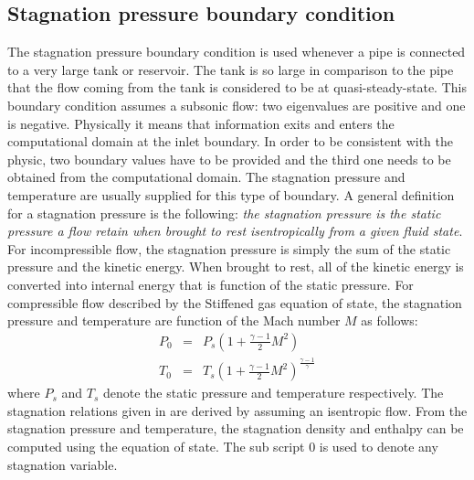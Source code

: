 \subsection{Stagnation pressure boundary condition} \label{sec:stag_pressure_bc}
The stagnation pressure boundary condition is used whenever a pipe is connected to a very large tank or reservoir. The tank is so large in comparison to the pipe that the flow coming from the tank is considered to be at quasi-steady-state. This boundary condition assumes a subsonic flow: two eigenvalues are positive and one is negative. Physically it means that information exits and enters the computational domain at the inlet boundary.  In order to be consistent with the physic, two boundary values have to be provided and the third one needs to be obtained from the computational domain. The stagnation pressure and temperature are usually supplied for this type of boundary. A general definition for a stagnation pressure is the following: \emph{the stagnation pressure is the static pressure a flow retain when brought to rest isentropically from a given fluid state}. For incompressible flow, the stagnation pressure is simply the sum of the static pressure and the kinetic energy. When brought to rest, all of the kinetic energy is converted into internal energy that is function of the static pressure. For compressible flow described by the Stiffened gas equation of state, the stagnation pressure and temperature are function of the Mach number $M$ as follows:
\begin{eqnarray}\label{eq:stag_bc}
P_0 &=& P_s \left( 1 + \frac{\gamma-1}{2}M^2 \right)\\
T_0 &=& T_s \left( 1 + \frac{\gamma-1}{2}M^2 \right)^{\frac{\gamma-1}{\gamma}}
\end{eqnarray}   
where $P_s$ and $T_s$ denote the static pressure and temperature respectively. The stagnation relations given in  are derived by assuming an isentropic flow. From the stagnation pressure and temperature, the stagnation density and enthalpy can be computed using the equation of state. The sub script $0$ is used to denote any stagnation variable. \\
